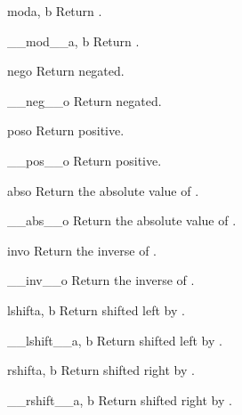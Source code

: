 \begin{funcdesc}{mod}{a, b}
Return  \code{\%} .
\end{funcdesc}

\begin{funcdesc}{__mod__}{a, b}
Return  \code{\%} .
\end{funcdesc}

\begin{funcdesc}{neg}{o}
Return  negated.
\end{funcdesc}

\begin{funcdesc}{__neg__}{o}
Return  negated.
\end{funcdesc}

\begin{funcdesc}{pos}{o}
Return  positive.
\end{funcdesc}

\begin{funcdesc}{__pos__}{o}
Return  positive.
\end{funcdesc}

\begin{funcdesc}{abs}{o}
Return the absolute value of .
\end{funcdesc}

\begin{funcdesc}{__abs__}{o}
Return the absolute value of .
\end{funcdesc}

\begin{funcdesc}{inv}{o}
Return the inverse of .
\end{funcdesc}

\begin{funcdesc}{__inv__}{o}
Return the inverse of .
\end{funcdesc}

\begin{funcdesc}{lshift}{a, b}
Return  shifted left by .
\end{funcdesc}

\begin{funcdesc}{__lshift__}{a, b}
Return  shifted left by .
\end{funcdesc}

\begin{funcdesc}{rshift}{a, b}
Return  shifted right by .
\end{funcdesc}

\begin{funcdesc}{__rshift__}{a, b}
Return  shifted right by .
\end{funcdesc}

